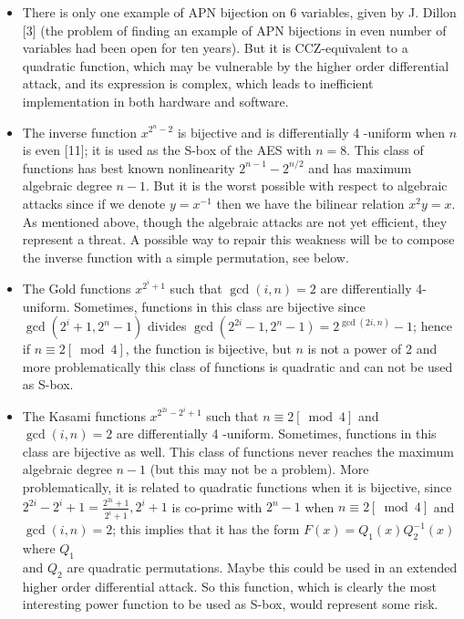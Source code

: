 \documentclass[10pt]{article}
\begin{document}
\begin{itemize}
  \item There is only one example of APN bijection on 6 variables, given by J. Dillon [3] (the problem of finding an example of APN bijections in even number of variables had been open for ten years). But it is CCZ-equivalent to a quadratic function, which may be vulnerable by the higher order differential attack, and its expression is complex, which leads to inefficient implementation in both hardware and software.
  \item The inverse function $x^{2^{n}-2}$ is bijective and is differentially 4 -uniform when $n$ is even [11]; it is used as the S-box of the AES with $n=8$. This class of functions has best known nonlinearity $2^{n-1}-2^{n / 2}$ and has maximum algebraic degree $n-1$. But it is the worst possible with respect to algebraic attacks since if we denote $y=x^{-1}$ then we have the bilinear relation $x^{2} y=x$. As mentioned above, though the algebraic attacks are not yet efficient, they represent a threat. A possible way to repair this weakness will be to compose the inverse function with a simple permutation, see below.
  \item The Gold functions $x^{2^{i}+1}$ such that $\operatorname{gcd}(i, n)=2$ are differentially 4-uniform. Sometimes, functions in this class are bijective since $\operatorname{gcd}\left(2^{i}+1,2^{n}-1\right)$ divides $\operatorname{gcd}\left(2^{2 i}-\right. \left.1,2^{n}-1\right)=2^{\operatorname{gcd}(2 i, n)}-1$; hence if $n \equiv 2[\bmod 4]$, the function is bijective, but $n$ is not a power of 2 and more problematically this class of functions is quadratic and can not be used as S-box.
  \item The Kasami functions $x^{2^{2 i}-2^{i}+1}$ such that $n \equiv 2[\bmod 4]$ and $\operatorname{gcd}(i, n)=2$ are differentially 4 -uniform. Sometimes, functions in this class are bijective as well. This class of functions never reaches the maximum algebraic degree $n-1$ (but this may not be a problem). More problematically, it is related to quadratic functions when it is bijective, since $2^{2 i}-2^{i}+1=\frac{2^{3 i}+1}{2^{i}+1}, 2^{i}+1$ is co-prime with $2^{n}-1$ when $n \equiv 2[\bmod 4]$ and $\operatorname{gcd}(i, n)=2$; this implies that it has the form $F(x)=Q_{1}(x) Q_{2}^{-1}(x)$ where $Q_{1}$\\
and $Q_{2}$ are quadratic permutations. Maybe this could be used in an extended higher order differential attack. So this function, which is clearly the most interesting power function to be used as S-box, would represent some risk.

\end{itemize}
\end{document}
